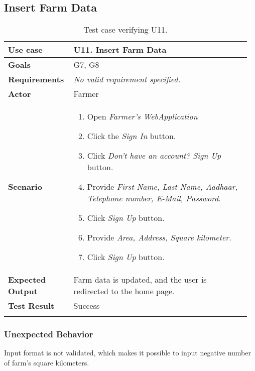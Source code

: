 \subsection{Insert Farm Data}
\begin{longtable}{@{}p{0.25\linewidth}p{0.71\linewidth}@{}}
	\toprule
	\textbf{Use case} & \textbf{U11.} Insert Farm Data\\
	\midrule
	\textbf{Goals} & G7, G8\\
	\midrule
	\textbf{Requirements} & \textit{No valid requirement specified.}\\
	\midrule
	\textbf{Actor} & Farmer\\
	\midrule
	\textbf{Scenario} &
	\begin{enumerate}[leftmargin=.4cm,noitemsep,topsep=0pt,before=\vspace{-3mm},after=\vspace{-4mm}]
		\item Open \textit{Farmer's WebApplication}
		\item Click the \textit{Sign In} button.
		\item Click \textit{Don't have an account? Sign Up} button.
		\item Provide \textit{First Name, Last Name, Aadhaar, Telephone number, E-Mail, Password}.
		\item Click \textit{Sign Up} button.
		\item Provide \textit{Area, Address, Square kilometer}.
		\item Click \textit{Sign Up} button.
 	\end{enumerate}\\
	\midrule
	\textbf{Expected Output} & Farm data is updated, and the user is redirected to the home page.\\
	\midrule
	\textbf{Test Result} & Success\\
	\bottomrule
    \caption{Test case verifying U11.}
\end{longtable}

\subsubsection*{Unexpected Behavior}
Input format is not validated, which makes it possible to input negative number of farm's square kilometers.


